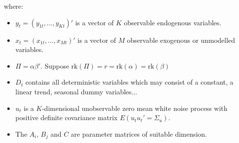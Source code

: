 \documentclass[10pt, a4paper, landscape]{extarticle}
\begin{document}
\begin{multicols}{3}
where:
\begin{itemize}[leftmargin=*]
	\item $y_t = (y_{1t}, ..., y_{Kt})'$ is a vector of $K$ observable endogenous variables.
	\item $x_t = (x_{1t}, ..., x_{Mt})'$ is a vector of $M$ observable exogenous or unmodelled variables.
	\item $\Pi = \alpha \beta'$. Suppose $\mathrm{rk}(\Pi) = r = \mathrm{rk}(\alpha) = \mathrm{rk}(\beta)$
	\item $D_t$ contains all deterministic variables which may consist of a constant, a linear trend, seasonal dummy variables...
	\item $u_t$ is a $K$-dimensional unobservable zero mean white noise process with positive definite covariance matrix $E(u_t u_t' = \Sigma_u)$.
	\item The $A_i$, $B_j$ and $C$ are parameter matrices of suitable dimension.
\end{itemize}


\end{multicols}
\end{document}

